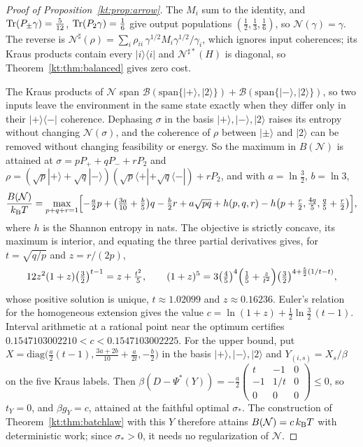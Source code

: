 \begin{proof}[Proof of Proposition~\ref{kt:prop:arrow}]
The $M_i$ sum to the identity, and $\operatorname{Tr}(P_\pm\gamma)=\tfrac5{12}$, $\operatorname{Tr}(P_2\gamma)=\tfrac16$ give output populations $(\tfrac12,\tfrac13,\tfrac16)$, so $\mathcal N(\gamma)=\gamma$. The reverse is $\mathcal N^\sharp(\rho)=\sum_i\rho_{ii}\,\gamma^{1/2}M_i\gamma^{1/2}/\gamma_i$, which ignores input coherences; its Kraus products contain every $|i\rangle\langle i|$ and $\mathcal N^{\sharp*}(H)$ is diagonal, so Theorem~\ref{kt:thm:balanced} gives zero cost.

The Kraus products of $\mathcal N$ span $\mathcal B(\mathrm{span}\{|+\rangle,|2\rangle\})+\mathcal B(\mathrm{span}\{|-\rangle,|2\rangle\})$, so two inputs leave the environment in the same state exactly when they differ only in their $|+\rangle\langle-|$ coherence. Dephasing $\sigma$ in the basis $|+\rangle,|-\rangle,|2\rangle$ raises its entropy without changing $\mathcal N(\sigma)$, and the coherence of $\rho$ between $|\pm\rangle$ and $|2\rangle$ can be removed without changing feasibility or energy. So the maximum in $B(\mathcal N)$ is attained at $\sigma=pP_++qP_-+rP_2$ and $\rho=(\sqrt p|+\rangle+\sqrt q|-\rangle)(\sqrt p\langle+|+\sqrt q\langle-|)+rP_2$, and with $a=\ln\frac32$, $b=\ln3$,
\[
\frac{B(\mathcal N)}{k_{\mathrm B} T}=\max_{p+q+r=1}\Bigl[-\tfrac a2p+\bigl(\tfrac{3a}{10}+\tfrac b5\bigr)q-\tfrac b2r+a\sqrt{pq}+h(p,q,r)-h\bigl(p+\tfrac r2,\tfrac{4q}5,\tfrac q5+\tfrac r2\bigr)\Bigr],
\]
where $h$ is the Shannon entropy in nats. The objective is strictly concave, its maximum is interior, and equating the three partial derivatives gives, for $t=\sqrt{q/p}$ and $z=r/(2p)$,
\[
12z^2(1+z)\bigl(\tfrac32\bigr)^{t-1}=z+\tfrac{t^2}5,\qquad(1+z)^5=3\bigl(\tfrac45\bigr)^4\Bigl(\tfrac15+\tfrac z{t^2}\Bigr)\bigl(\tfrac32\bigr)^{4+\frac52(1/t-t)},
\]
whose positive solution is unique, $t\approx1.02099$ and $z\approx0.16236$. Euler's relation for the homogeneous extension gives the value $c=\ln(1+z)+\tfrac12\ln\tfrac32\,(t-1)$. Interval arithmetic at a rational point near the optimum certifies $0.1547103002210<c<0.1547103002225$. For the upper bound, put $X=\mathrm{diag}\bigl(\tfrac a2(t-1),\tfrac{3a+2b}{10}+\tfrac a{2t},-\tfrac b2\bigr)$ in the basis $|+\rangle,|-\rangle,|2\rangle$ and $Y_{(i,s)}=X_s/\beta$ on the five Kraus labels. Then $\beta(D-\Psi^*(Y))=-\tfrac a2\left(\begin{smallmatrix}t&-1&0\\-1&1/t&0\\0&0&0\end{smallmatrix}\right)\le0$, so $t_Y=0$, and $\beta g_Y=c$, attained at the faithful optimal $\sigma_*$. The construction of Theorem~\ref{kt:thm:batchlaw} with this $Y$ therefore attains $B(\mathcal N)=c\,k_{\mathrm B} T$ with deterministic work; since $\sigma_*>0$, it needs no regularization of $\mathcal N$.
\end{proof}

